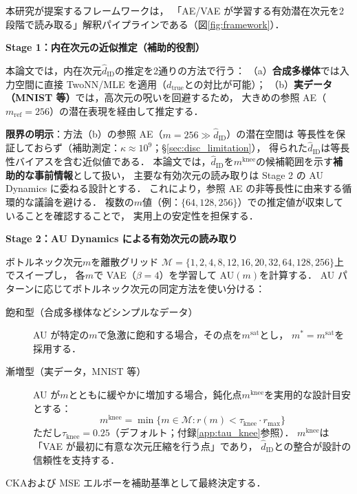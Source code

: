 \documentclass[11pt,a4paper]{jsarticle}
\newcommand{\dzopt}{m^*}
\newcommand{\dtrue}{d_{\mathrm{true}}}
\newcommand{\kap}{\kappa}
\newcommand{\dzsat}{m^{\mathrm{sat}}}
\newcommand{\mknee}{m^{\mathrm{knee}}}
\begin{document}
本研究が提案するフレームワークは，
「AE/VAE が学習する有効潜在次元を2段階で読み取る」解釈パイプラインである（図\ref{fig:framework}）．

\textbf{Stage 1：内在次元の近似推定（補助的役割）}

本論文では，内在次元$\hat{d}_\mathrm{ID}$の推定を2通りの方法で行う：
（a）\textbf{合成多様体}では入力空間に直接 TwoNN/MLE を適用（$\dtrue$との対比が可能）；
（b）\textbf{実データ（MNIST 等）}では，高次元の呪いを回避するため，
大きめの参照 AE（$m_{\mathrm{ref}} = 256$）の潜在表現を経由して推定する．

\textbf{限界の明示}：方法（b）の参照 AE（$m = 256 \gg \hat{d}_\mathrm{ID}$）の潜在空間は
等長性を保証しておらず（補助測定：$\kap \approx 10^9$；§\ref{sec:disc_limitation}），
得られた$\hat{d}_\mathrm{ID}$は等長性バイアスを含む近似値である．
本論文では，$\hat{d}_\mathrm{ID}$を$\mknee$の候補範囲を示す\textbf{補助的な事前情報}として扱い，
主要な有効次元の読み取りは Stage 2 の AU Dynamics に委ねる設計とする．
これにより，参照 AE の非等長性に由来する循環的な議論を避ける．
複数の$m$値（例：$\{64, 128, 256\}$）での推定値が収束していることを確認することで，
実用上の安定性を担保する．

\textbf{Stage 2：AU Dynamics による有効次元の読み取り}

ボトルネック次元$m$を離散グリッド
$\mathcal{M} = \{1, 2, 4, 8, 12, 16, 20, 32, 64, 128, 256\}$上でスイープし，
各$m$で VAE（$\beta = 4$）を学習して AU$(m)$を計算する．
AU パターンに応じてボトルネック次元の同定方法を使い分ける：

\begin{description}
  \item[飽和型（合成多様体などシンプルなデータ）]
        AU が特定の$m$で急激に飽和する場合，その点を$\dzsat$とし，
        $\dzopt = \dzsat$を採用する．
  \item[漸増型（実データ，MNIST 等）]
        AU が$m$とともに緩やかに増加する場合，鈍化点$\mknee$を実用的な設計目安とする：
        \begin{equation}
          \mknee = \min\{m \in \mathcal{M} : r(m) < \tau_{\mathrm{knee}} \cdot r_{\max}\}
          \label{eq:mknee}
        \end{equation}
        ただし$\tau_{\mathrm{knee}} = 0.25$（デフォルト；付録\ref{app:tau_knee}参照）．
        $\mknee$は「VAE が最初に有意な次元圧縮を行う点」であり，
        $\hat{d}_\mathrm{ID}$との整合が設計の信頼性を支持する．
\end{description}

CKA\cite{kornblith2019cka}および MSE エルボーを補助基準として最終決定する．
\end{document}
